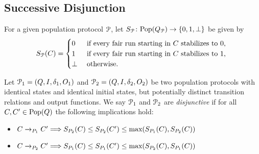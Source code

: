 \newcommand{\revtrans}{\leftrightsquigarrow}

\subsection{Successive Disjunction}
For a given population protocol $\mathcal{P}$, let 
$S_{\mathcal{P}} \colon \mathrm{Pop}(Q_{\mathcal{P}}) \rightarrow \left\{0, 1, \bot\right\}$ be given by
$$S_{\mathcal{P}}(C) = \begin{cases}
         0 & \text{ if  every fair run starting in $C$ stabilizes to $0$, } \\
         1 & \text{ if every fair run starting in $C$ stabilizes to $1$, } \\
         \bot & \text{ otherwise. }
         \end{cases}
$$

Let $\mathcal{P}_1 = (Q, I, \delta_1, O_1)$ and $\mathcal{P}_2 = (Q, I, \delta_2, O_2)$ 
be two population protocols with identical states and identical initial states, 
but potentially distinct transition relations and output functions. 
We say $\mathcal{P}_1$ and $\mathcal{P}_2$ are \emph{disjunctive} if for all $C, C' \in \mathrm{Pop}(Q)$
the following implications hold:
\begin{itemize}
	\item $C \xrightarrow{}_{P_1} C' \Longrightarrow
	       S_{P_2}(C) \leq S_{P_2}(C') \leq \text{max}(S_{P_1}(C), S_{P_2}(C))$
	\item $C \xrightarrow{}_{P_2} C' \Longrightarrow 
	       S_{P_1}(C) \leq S_{P_1}(C') \leq \text{max}(S_{P_2}(C), S_{P_1}(C))$
\end{itemize}

